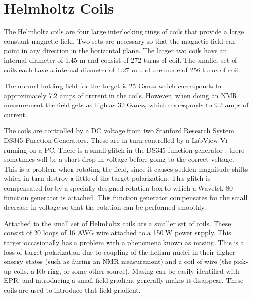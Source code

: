 \section{Helmholtz Coils}
\label{sec:helmholtz}

The Helmholtz coils are four large interlocking rings of coils that provide a large constant magnetic field.  Two sets are necessary so that the magnetic field can point in any direction in the horizontal plane.  The larger two coils have an internal diameter of 1.45 m and consist of 272 turns of coil.  The smaller set of coils each have a internal diameter of 1.27 m and are made of 256 turns of coil. 

The normal holding field for the target is 25 Gauss which corresponds to approximately 7.2 amps of current in the coils.  However, when doing an NMR measurement the field gets as high as 32 Gauss, which corresponds to 9.2 amps of current.  

The coils are controlled by a DC voltage from two Stanford Research System DS345 Function Generators.  These are in turn controlled by a LabView Vi running on a PC.  There is a small glitch in the DS345 function generator : there sometimes will be a short drop in voltage before going to the correct voltage.  This is a problem when rotating the field, since it causes sudden magnitude shifts which in turn destroy a little of the target polarization.  This glitch is compensated for by a specially designed rotation box to which a Wavetek 80 function generator is attached.  This function generator compensates for the small decrease in voltage so that the rotation can be performed smoothly.  

Attached to the small set of Helmholtz coils are a smaller set of coils.  These consist of 20 loops of 16 AWG wire attached to a 150 W power supply.  This target occasionally has a problem with a phenomena known as masing.   This is a loss of target polarization due to coupling of the helium nuclei in their higher
 energy states (such as during an NMR measurement) and a coil of wire (the pick-up coils, a Rb ring, or some other source).  Masing can be easily identified with EPR, and introducing a small field gradient generally makes it disappear.  These coils are used to introduce that field gradient.


